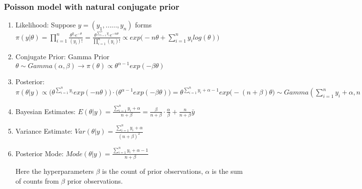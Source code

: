 \documentclass{beamer}
\begin{document}
\begin{frame}
\frametitle{Poisson model with natural conjugate prior}

\begin{enumerate}
\item Likelihood: Suppose $y = (y_1, ......, y_n)$ forms $\pi(y|\theta) = \prod_{i=1}^n \frac{\theta^{y_i}e^{-\theta}}{(y_i)!} = \frac{\theta^{\sum_{i=1}^n y_i} e^{-n\theta}}{\prod_{i=1}^n(y_i)!} \propto exp\Big(-n\theta + \sum_{i=1}^n y_i log(\theta) \Big)$
\item Conjugate Prior: Gamma Prior $\theta \sim Gamma(\alpha,\beta) \rightarrow \pi(\theta) \propto \theta^{\alpha-1}exp(-\beta \theta)$
\item Posterior: $\pi(\theta|y) \propto \Big(\theta^{\sum_{i=1}^n y_i} exp(-n\theta)\Big)\cdot \Big(\theta^{\alpha-1}exp(-\beta \theta)\Big) = \theta^{\sum_{i=1}^n y_i + \alpha - 1} exp\Big(-(n+\beta) \theta\Big) \sim Gamma(\sum_{i=1}^n y_i + \alpha, n+\beta)$ 
\item Bayesian Estimates: $E(\theta|y) = \frac{\sum_{i=1}^n y_i + \alpha}{n+\beta} = \frac{\beta}{n+\beta}\cdot \frac{\alpha}{\beta} + \frac{n}{n+\beta} \bar y$
\item Variance Estimate: $Var(\theta|y) = \frac{\sum_{i=1}^n y_i + \alpha}{(n+\beta)^2}$
\item Posterior Mode: $Mode(\theta|y) = \frac{\sum_{i=1}^n y_i + \alpha-1}{n+\beta}$ 

Here the hyperparameters $\beta$ is the count of prior observations, $\alpha$ is the sum of counts from $\beta$ prior observations.

\end{enumerate}

\end{frame}

\end{document}
